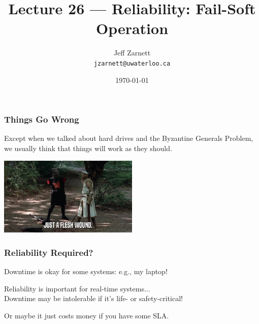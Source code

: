

\title{Lecture 26 --- Reliability: Fail-Soft Operation }

\author{Jeff Zarnett \\ \small \texttt{jzarnett@uwaterloo.ca}}
\date{\today}




\begin{frame}
  \titlepage

 \end{frame}



\begin{frame}
\frametitle{Things Go Wrong}

Except when we talked about hard drives and the Byzantine Generals Problem, we usually think that things will work as they should.

\begin{center}
	\includegraphics[width=0.5\textwidth]{images/fleshwound.jpg}
\end{center}

\end{frame}

\begin{frame}
\frametitle{Reliability Required?}

Downtime is okay for some systems: e.g., my laptop!

Reliability is important for real-time systems...\\
\quad Downtime may be intolerable if it's life- or safety-critical!


Or maybe it just costs money if you have some SLA.

\end{frame}


